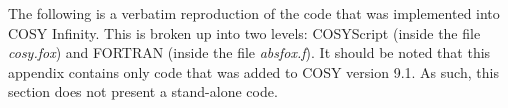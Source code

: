 The following is a verbatim reproduction of the code that was implemented into COSY Infinity. This is broken up into two levels: COSYScript (inside the file \textit{cosy.fox}) and FORTRAN (inside the file \textit{absfox.f}). It should be noted that this appendix contains only code that was added to COSY version 9.1. As such, this section does not present a stand-alone code.

\label{sec:cosyscript}





\makeatletter
\newcommand{\ProcessDigit}[1]
{%
  \ifnum\lst@mode=\lst@Pmode\relax%
   {\color{dred} #1}%
  \else
    #1%
  \fi
}
\makeatletter
\newcommand{\ProcessOperator}[1]
{%
  \ifnum\lst@mode=\lst@Pmode\relax%
   {\color{lblue} #1}%
  \else
    #1%
  \fi
}

